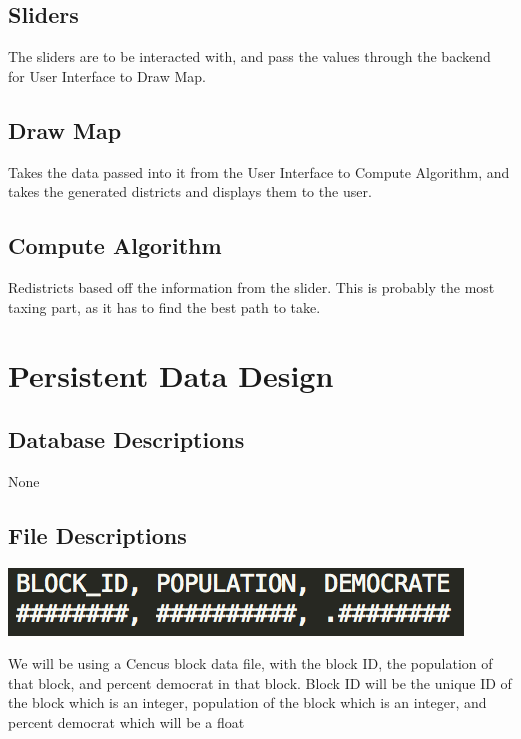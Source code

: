 \documentclass{article}
\begin{document}
\subsection{Sliders}
The sliders are to be interacted with, and pass the values through the backend for User Interface to Draw Map.

\subsection{Draw Map}
Takes the data passed into it from the User Interface to Compute Algorithm, and takes the generated districts and displays them to the user.

\subsection{Compute Algorithm}
Redistricts based off the information from the slider. This is probably the most taxing part, as it has to find the best path to take.

\section{Persistent Data Design}
\subsection{Database Descriptions}
None

\subsection{File Descriptions}
\vspace{2.5mm}
\begin{center}
\includegraphics[scale=1]{Csv_data.png}
\end{center}
\vspace{2.5mm}

We will be using a Cencus block data file, with the block ID, the population of that block, and percent democrat in that block.
Block ID will be the unique ID of the block which is an integer, population of the block which is an integer, and percent democrat which will be a float
\end{document}

